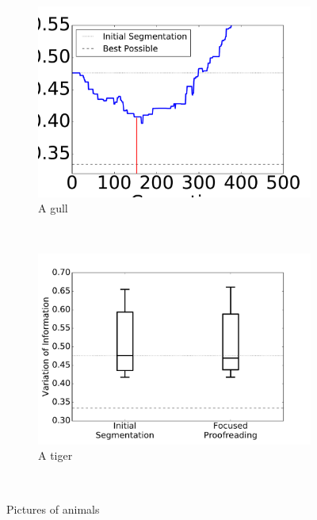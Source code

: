 \begin{figure}
\begin{subfigure}[b]{0.24\textwidth}
        \includegraphics[width=\textwidth]{gfx/gpauto.pdf}
        \caption{A gull}
        \label{fig:gull}
    \end{subfigure}
    ~ %
    \begin{subfigure}[b]{0.24\textwidth}
        \includegraphics[width=\textwidth]{gfx/fc_fp_ac4.pdf}
        \caption{A tiger}
        \label{fig:tiger}
    \end{subfigure}
    ~ %
    \caption{Pictures of animals}\label{fig:animals}
\end{figure}

